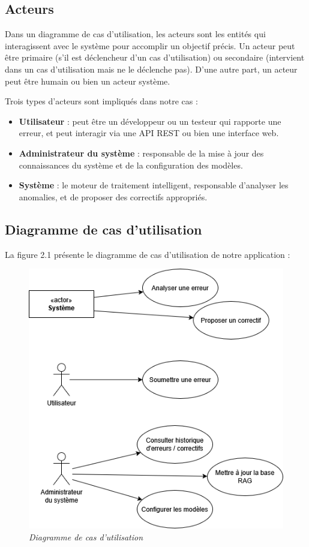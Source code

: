 \documentclass[12pt,a4paper]{report}
\begin{document}
	\subsection{Acteurs}
	
	Dans un diagramme de cas d'utilisation, les acteurs sont les entités qui interagissent avec le système pour accomplir un objectif précis. Un acteur peut être primaire (s'il est déclencheur d'un cas d'utilisation) ou secondaire (intervient dans un cas d'utilisation mais ne le déclenche pas). D'une autre part, un acteur peut être humain ou bien un acteur système.
	
	Trois types d'acteurs sont impliqués dans notre cas :
	
	\begin{itemize}
		\item \textbf{Utilisateur} : peut être un développeur ou un testeur qui rapporte une erreur, et peut interagir via une API REST ou bien une interface web.
		
		\item \textbf{Administrateur du système} : responsable de la mise à jour des connaissances du système et de la configuration des modèles.
		
		\item \textbf{Système} : le moteur de traitement intelligent, responsable d'analyser les anomalies, et de proposer des correctifs appropriés.
	\end{itemize}
	
	\subsection{Diagramme de cas d'utilisation}
	
	La figure 2.1 présente le diagramme de cas d'utilisation de notre application :
	
	\begin{figure}[H]
		\centering
		\includegraphics{use-case.drawio.png}
		\caption{\textit{Diagramme de cas d'utilisation}}
		\label{fig:use-case}
	\end{figure}
	
\end{document}

